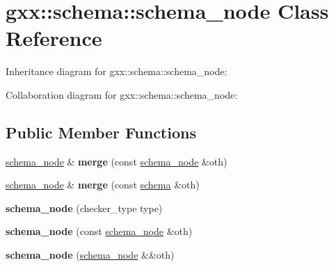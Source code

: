 \hypertarget{classgxx_1_1schema_1_1schema__node}{}\section{gxx\+:\+:schema\+:\+:schema\+\_\+node Class Reference}
\label{classgxx_1_1schema_1_1schema__node}


Inheritance diagram for gxx\+:\+:schema\+:\+:schema\+\_\+node\+:


Collaboration diagram for gxx\+:\+:schema\+:\+:schema\+\_\+node\+:
\subsection*{Public Member Functions}
\begin{DoxyCompactItemize}
\item 
\hyperlink{classgxx_1_1schema_1_1schema__node}{schema\+\_\+node} \& {\bfseries merge} (const \hyperlink{classgxx_1_1schema_1_1schema__node}{schema\+\_\+node} \&oth)\hypertarget{classgxx_1_1schema_1_1schema__node_a8b9d0803322778376ebe6da07e9c9dd2}{}\label{classgxx_1_1schema_1_1schema__node_a8b9d0803322778376ebe6da07e9c9dd2}

\item 
\hyperlink{classgxx_1_1schema_1_1schema__node}{schema\+\_\+node} \& {\bfseries merge} (const \hyperlink{classgxx_1_1schema}{schema} \&oth)\hypertarget{classgxx_1_1schema_1_1schema__node_a9e77f7d07d602d6a5c90a3cabd895811}{}\label{classgxx_1_1schema_1_1schema__node_a9e77f7d07d602d6a5c90a3cabd895811}

\item 
{\bfseries schema\+\_\+node} (checker\+\_\+type type)\hypertarget{classgxx_1_1schema_1_1schema__node_abdd82aacb93a35f1b9c70bc551c21c5a}{}\label{classgxx_1_1schema_1_1schema__node_abdd82aacb93a35f1b9c70bc551c21c5a}

\item 
{\bfseries schema\+\_\+node} (const \hyperlink{classgxx_1_1schema_1_1schema__node}{schema\+\_\+node} \&oth)\hypertarget{classgxx_1_1schema_1_1schema__node_a48a5d3bef17054ab5f812beeba9234fc}{}\label{classgxx_1_1schema_1_1schema__node_a48a5d3bef17054ab5f812beeba9234fc}

\item 
{\bfseries schema\+\_\+node} (\hyperlink{classgxx_1_1schema_1_1schema__node}{schema\+\_\+node} \&\&oth)\hypertarget{classgxx_1_1schema_1_1schema__node_a23e212c3bb46448f65c8f9102281d643}{}\label{classgxx_1_1schema_1_1schema__node_a23e212c3bb46448f65c8f9102281d643}


\end{DoxyCompactItemize}
